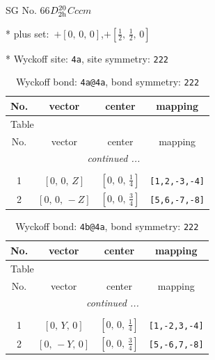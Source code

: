 \documentclass[fleqn,8pt]{jsarticle}
\begin{document}
\setcounter{MaxMatrixCols}{32}

\renewcommand{\tablename}{Table~}
\renewcommand{\figurename}{Figure~}
\begin{center}
\LARGE
SG No. 66\quad$D_{\rm 2h}^{20}$\quad$Cccm$\quad[ orthorhombic ]
\end{center}

* plus set:\,\,\,$+\left[ 0,\, 0,\, 0 \right]$,\quad $+\left[ \frac{1}{2},\, \frac{1}{2},\, 0 \right]$


* Wyckoff site: {\tt 4a}, site symmetry: {\tt 222}
\renewcommand{\arraystretch}{1.2}
\begin{longtable}{cccc}
\caption{Wyckoff bond: {\tt 4a@4a}, bond symmetry: {\tt 222}}
 \\
 \hline \hline
No. & vector & center & mapping \\ \hline \endfirsthead

\multicolumn{3}{l}{\tablename\ \thetable{}} \\
 \hline \hline
No. & vector & center & mapping \\ \hline \endhead

 \hline \hline
\multicolumn{3}{r}{\footnotesize\it continued ...} \\ \endfoot

 \hline \hline
\multicolumn{3}{r}{} \\ \endlastfoot

1 & $\left[ 0,\, 0,\, Z \right]$ & $\left[ 0,\, 0,\, \frac{1}{4} \right]$ & {\tt [1,2,-3,-4]} \\ \hline
2 & $\left[ 0,\, 0,\, - Z \right]$ & $\left[ 0,\, 0,\, \frac{3}{4} \right]$ & {\tt [5,6,-7,-8]} \\
\end{longtable}
\renewcommand{\arraystretch}{1.2}
\begin{longtable}{cccc}
\caption{Wyckoff bond: {\tt 4b@4a}, bond symmetry: {\tt 222}}
 \\
 \hline \hline
No. & vector & center & mapping \\ \hline \endfirsthead

\multicolumn{3}{l}{\tablename\ \thetable{}} \\
 \hline \hline
No. & vector & center & mapping \\ \hline \endhead

 \hline \hline
\multicolumn{3}{r}{\footnotesize\it continued ...} \\ \endfoot

 \hline \hline
\multicolumn{3}{r}{} \\ \endlastfoot

1 & $\left[ 0,\, Y,\, 0 \right]$ & $\left[ 0,\, 0,\, \frac{1}{4} \right]$ & {\tt [1,-2,3,-4]} \\ \hline
2 & $\left[ 0,\, - Y,\, 0 \right]$ & $\left[ 0,\, 0,\, \frac{3}{4} \right]$ & {\tt [5,-6,7,-8]} \\
\end{longtable}
\end{document}
